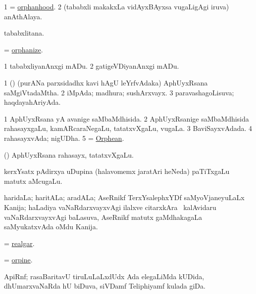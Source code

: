 \bentry
{}
\gl{\nA}
\bmng
\bnum
\num{1} = \hyperlink{orphanhood}{orphanhood}. 
\num{2} (tababxli makakxLa vidAyxBAyxsa \mo vugaLigAgi iruva) anAthAlaya. 
\enum
\emng
\eentry

\bentry
{}
\gl{\nA}
\bmng
tababxlitana. 
\emng
\eentry

\bentry
{}
\gl{\sakirx}
\bmng
= \hyperlink{orphanize}{orphanize}. 
\emng
\eentry

\bentry
{}
\gl{\sakirx}
\bmng
\bnum
\num{1} tababxliyanAnxgi mADu. 
\num{2} gatigeVDiyanAnxgi mADu. 
\enum
\emng
\eentry

\bentry
{}
\gl{\gu}
\bmng
\bnum
\num{1} (\girxVpu) (purANa parxsidadhx kavi hAgU leYrfvAdaka) AphUyxRsana saMgiVtadaMtha. 
\num{2} iMpAda; madhura; sushArxvayx. 
\num{3} paravashagoLisuva; haqdayahAriyAda. 
\enum
\emng
\eentry

\bentry
{}
\gl{\gu}
\bmng
\bnum
\num{1} AphUyxRsana yA avanige saMbaMdhisida. 
\num{2} AphUyxRsanige saMbaMdhisida rahasayxgaLu, kamARcaraNegaLu, tatatxvXgaLu, \mo vugaLa. 
\num{3} BaviSayxvAdada. 
\num{4} rahasayxvAda; nigUDha. 
\num{5} = \hyperlink{Orphean}{Orphean}. 
\enum
\emng
\eentry

\bentry
{}
\gl{\nA}
\bmng
(\girxVpu) AphUyxRsana rahasayx, tatatxvXgaLu. 
\emng
\eentry

\bentry
{}
\gl{\nA}
\bmng
kerxYsatx pAdirxya uDupina (halavomemx jaratAri heNeda) paTiTxgaLu matutx aMcugaLu. 
\emng
\eentry

\bentry
{}
\gl{\nA}
\bmng
haridaLa; haritALa; aradALa; AseRnikf TerxYsalephxYDf saMyoVjaneyuLaLx Kanija; haLadiya vaNaRdarxvayxvAgi ilalxve citarxkAra \mo\ kalAvidaru vaNaRdarxvayxvAgi baLasuva, AseRnikf matutx gaMdhakagaLa saMyukatxvAda oMdu Kanija. 
\emng

\noindent
\gl{\pagu}
\bmng
{} = \hyperref{kandict_r.pdf}{R}{realgar}{realgar}. 
\emng
\eentry

\bentry
{}
\gl{\nA}
\bmng
= \hyperlink{orpine}{orpine}. 
\emng
\eentry

\bentry
{}
\gl{\nA}
\bmng
ApiRnf; rasaBaritavU tiruLuLaLxdUdx Ada elegaLiMda kUDida, dhUmarxvaNaRda hU biDuva, siVDamf Teliphiyamf kulada giDa. 
\emng
\eentry

